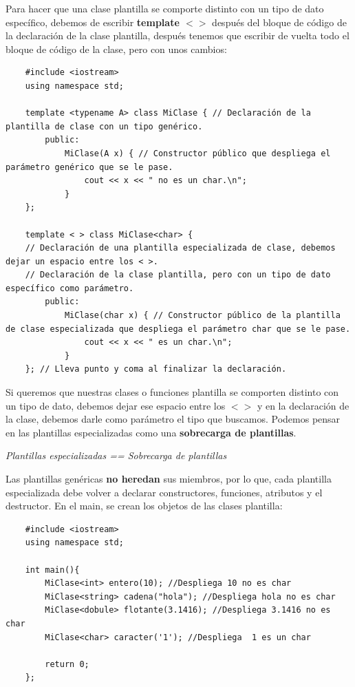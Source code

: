 Para hacer que una clase plantilla se comporte distinto con un tipo de dato específico, debemos de escribir \textbf{template $< >$} después del bloque de código de la declaración de la clase plantilla, después tenemos que escribir de vuelta todo el bloque de código de la clase, pero con unos cambios:
\begin{lstlisting}
    #include <iostream>
    using namespace std;
    
    template <typename A> class MiClase { // Declaración de la plantilla de clase con un tipo genérico.
        public:
            MiClase(A x) { // Constructor público que despliega el parámetro genérico que se le pase.
                cout << x << " no es un char.\n";
            }
    };
    
    template < > class MiClase<char> {
    // Declaración de una plantilla especializada de clase, debemos dejar un espacio entre los < >.
    // Declaración de la clase plantilla, pero con un tipo de dato específico como parámetro.
        public:
            MiClase(char x) { // Constructor público de la plantilla de clase especializada que despliega el parámetro char que se le pase.
                cout << x << " es un char.\n";
            }
    }; // Lleva punto y coma al finalizar la declaración.
\end{lstlisting}

Si queremos que nuestras clases o funciones plantilla se comporten distinto con un tipo de dato, debemos dejar ese espacio entre los $< >$ y en la declaración de la clase, debemos darle como parámetro el tipo que buscamos. Podemos pensar en las plantillas especializadas como una \textbf{sobrecarga de plantillas}.
\begin{center}
	\textit{Plantillas especializadas == Sobrecarga de plantillas}
\end{center}

Las plantillas genéricas \textbf{no heredan} sus miembros, por lo que, cada plantilla especializada debe volver a declarar constructores, funciones, atributos y el destructor. En el main, se crean los objetos de las clases plantilla:
\begin{lstlisting}
    #include <iostream>
    using namespace std;
    
    int main(){
        MiClase<int> entero(10); //Despliega 10 no es char
        MiClase<string> cadena("hola"); //Despliega hola no es char
        MiClase<dobule> flotante(3.1416); //Despliega 3.1416 no es char
        MiClase<char> caracter('1'); //Despliega  1 es un char
        
        return 0;
    };
\end{lstlisting}



